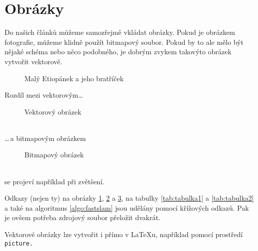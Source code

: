 \documentclass[hidelinks, 11pt, a4paper]{article}
\begin{document}
\section{Obrázky}
Do našich článků můžeme samozřejmě vkládat obrázky. Pokud je obrázkem fotografie,
můžeme klidně použít bitmapový soubor. Pokud by to ale mělo být nějaké schéma nebo
něco podobného, je dobrým zvykem takovýto obrázek vytvořit vektorově.
\begin{figure}[ht]
    \centering
    \caption{Malý Etiopánek a jeho bratříček}
    \label{fig:obrazek1}    
\end{figure}
\bigskip
\newpage
Rozdíl mezi vektorovým\dots
\begin{figure}[ht]
    \centering
    \caption{Vektorový obrázek}
    \label{fig:obrazek2}
\end{figure}\bigskip\\
\dots\,a bitmapovým obrázkem
\begin{figure}[ht]
    \centering
    \caption{Bitmapový obrázek}
    \label{fig:obrazek3}
\end{figure}\bigskip\\
se projeví například při zvětšení.

Odkazy (nejen ty) na obrázky \ref{fig:obrazek1}, \ref{fig:obrazek2} a \ref{fig:obrazek3}, na tabulky \ref{tab:tabulka1} a \ref{tab:tabulka2} a také na algoritmus \ref{algo:fastslam} jsou udělány pomocí křížových odkazů. Pak je ovšem potřeba zdrojový soubor přeložit dvakrát.

Vektorové obrázky lze vytvořit i přímo v \LaTeX u, například pomocí prostředí\texttt{ picture.}
\end{document}
